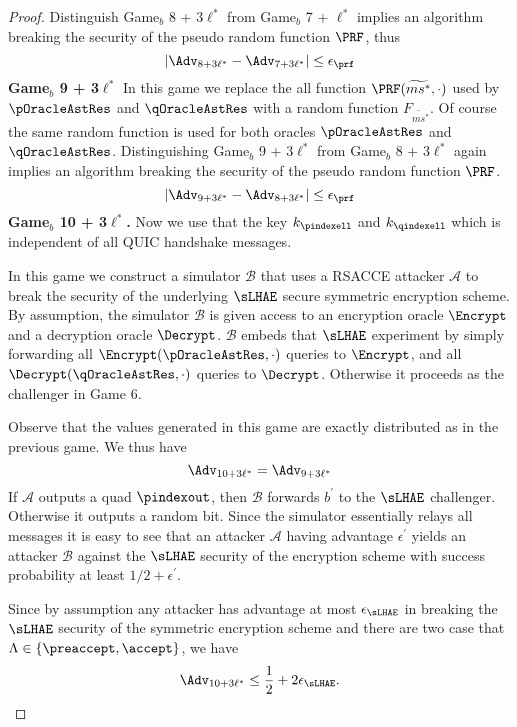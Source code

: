 \begin{proof}
 Distinguish Game$_b$ 8 + 3$\ell^{\ast}$ from Game$_b$ 7 + $\ell^{\ast}$ implies an algorithm breaking the security of the pseudo random function $\PRF$, thus
 \begin{equation}
  |\Adv_{8 + 3\ell^{\ast}} - \Adv_{7 + 3\ell^{\ast}}| \leq \epsilon_{\prf}
 \end{equation}%
%
%
 \textbf{Game$_b$ 9 + 3$\ell^{\ast}$} In this game we replace the all function $\PRF(\widetilde{ms^{\ast}}, \cdot)$ used by $\pOracleAstRes$ and $\qOracleAstRes$ with a random function $F_{\widetilde{ms^{\ast}}}$. Of course the same random function is used for both oracles $\pOracleAstRes$ and $\qOracleAstRes$. Distinguishing Game$_b$ 9 + 3$\ell^{\ast}$ from Game$_b$ 8 + 3$\ell^{\ast}$ again implies an algorithm breaking the security of the pseudo random function $\PRF$.
 \begin{equation}
  |\Adv_{9 + 3\ell^{\ast}} - \Adv_{8 + 3\ell^{\ast}}| \leq \epsilon_{\prf}
 \end{equation}%
%
%
 \textbf{Game$_b$ 10 + 3$\ell^{\ast}$.} Now we use that the key $k_{\pindexell}$ and $k_{\qindexell}$ which is independent of all QUIC handshake messages.

 In this game we construct a simulator $\mathcal{B}$ that uses a RSACCE attacker $\mathcal{A}$ to break the security of the underlying $\sLHAE$ secure symmetric encryption scheme. By assumption, the simulator $\mathcal{B}$ is given access to an encryption oracle $\Encrypt$ and a decryption oracle $\Decrypt$. $\mathcal{B}$ embeds that $\sLHAE$ experiment by simply forwarding all $\Encrypt(\pOracleAstRes,\cdot)$ queries to $\Encrypt$, and all $\Decrypt(\qOracleAstRes,\cdot)$ queries to $\Decrypt$. Otherwise it proceeds as the challenger in Game 6.

 Observe that the values generated in this game are exactly distributed as in the previous game. We thus have
 \begin{equation}
  \Adv_{10 + 3\ell^{\ast}} = \Adv_{9 + 3\ell^{\ast}}
 \end{equation}%
 If $\mathcal{A}$ outputs a quad $\pindexout$, then $\mathcal{B}$ forwards $b^{\prime}$ to the $\sLHAE$ challenger. Otherwise it outputs a random bit. Since the simulator essentially relays all messages it is easy to see that an attacker $\mathcal{A}$ having advantage $\epsilon^{\prime}$ yields an attacker $\mathcal{B}$ against the $\sLHAE$ security of the encryption scheme with success probability at least $1/2 + \epsilon^{\prime}$.

 Since by assumption any attacker has advantage at most $\epsilon_{\sLHAE}$ in breaking the $\sLHAE$ security of the symmetric encryption scheme and there are two case that $\Lambda \in \{\preaccept, \accept\}$, we have
 \begin{equation}
  \Adv_{10 + 3\ell^{\ast}} \leq \frac{1}{2} + 2\epsilon_{\sLHAE}.
 \end{equation}%
\end{proof}